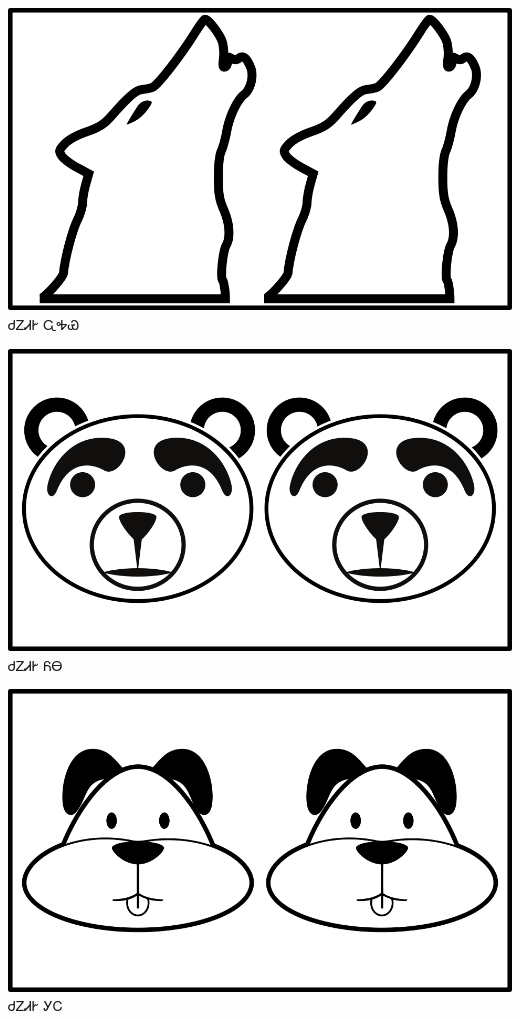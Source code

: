 \documentclass[avery5371]{flashcards}%
\begin{document}
    \begin{flashcard}{
        \includegraphics[width=0.95\columnwidth,height=.51\columnwidth,keepaspectratio]{../artwork/objects-animate/anitali-wahya}
    }
        \Huge ᏧᏃᏗᎨ ᏩᎭᏯ
    \end{flashcard}

    \begin{flashcard}{
        \includegraphics[width=0.95\columnwidth,height=.51\columnwidth,keepaspectratio]{../artwork/objects-animate/anitali-yona}
    }
        \Huge ᏧᏃᏗᎨ ᏲᎾ
    \end{flashcard}

    \begin{flashcard}{
        \includegraphics[width=0.95\columnwidth,height=.51\columnwidth,keepaspectratio]{../artwork/objects-animate/anitali-gihli}
    }
        \Huge ᏧᏃᏗᎨ ᎩᏟ
    \end{flashcard}
\end{document}
